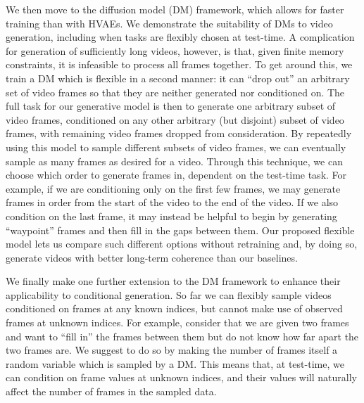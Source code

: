 
We then move to the diffusion model (DM) framework, which allows for faster training than with HVAEs. We demonstrate the suitability of DMs to video generation, including when tasks are flexibly chosen at test-time. A complication for generation of sufficiently long videos, however, is that, given finite memory constraints, it is infeasible to process all frames together. To get around this, we train a DM which is flexible in a second manner: it can ``drop out'' an arbitrary set of video frames so that they are neither generated nor conditioned on. The full task for our generative model is then to generate one arbitrary subset of video frames, conditioned on any other arbitrary (but disjoint) subset of video frames, with remaining video frames dropped from consideration. By repeatedly using this model to sample different subsets of video frames, we can eventually sample as many frames as desired for a video. Through this technique, we can choose which order to generate frames in, dependent on the test-time task. For example, if we are conditioning only on the first few frames, we may generate frames in order from the start of the video to the end of the video. If we also condition on the last frame, it may instead be helpful to begin by generating ``waypoint'' frames and then fill in the gaps between them. Our proposed flexible model lets us compare such different options without retraining and, by doing so, generate videos with better long-term coherence than our baselines.

We finally make one further extension to the DM framework to enhance their applicability to conditional generation. So far we can flexibly sample videos conditioned on frames at any known indices, but cannot make use of observed frames at unknown indices. For example, consider that we are given two frames and want to ``fill in'' the frames between them but do not know how far apart the two frames are. We suggest to do so by making the number of frames itself a random variable which is sampled by a DM. This means that, at test-time, we can condition on frame values at unknown indices, and their values will naturally affect the number of frames in the sampled data.

